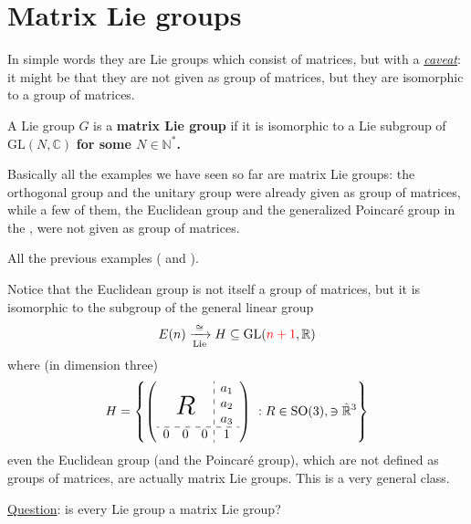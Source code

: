 \documentclass[../main.tex]{subfiles}
\begin{document}
\section{Matrix Lie groups}
In simple words they are Lie groups which consist of matrices, but with a \textit{\href{https://it.wikipedia.org/wiki/Caveat}{caveat}}: it might be that they are not given as group of matrices, but they are isomorphic to a group of matrices.
\begin{definition}A Lie group $G$ is a \textbf{matrix Lie group} if it is isomorphic to a Lie subgroup of $\textrm{GL}(N,\mathbb{C})$ \textbf{for some $N\in\mathbb{N}^\ast$.}
\end{definition}
Basically all the examples we have seen so far are matrix Lie groups: the orthogonal group and the unitary group were already given as group of matrices, while a few of them, the Euclidean group and the generalized Poincaré group in the , were not given as group of matrices.
\begin{example}
All the previous examples ( and ). 

Notice that the Euclidean group is not itself a group of matrices, but it is isomorphic to the subgroup of the general linear group
\[
E(n) \xrightarrow[\textrm{Lie}]{\cong}H \subseteq \textrm{GL}({\color{red}n+1}, \mathbb{R})
\]
where (in dimension three) 
\[
H=\Bqty{
\left(
\begin{array}{ccc:c}
& & & a_1\\
& \bigR & & a_2\\
& & & a_3\\
\hdashline
0&0&0 &1\\
\end{array}
\right) \ : R\in \textrm{SO}(3), \ni \hat{\mathbb{R}}^3
}
\]
even the Euclidean group (and the Poincaré group), which are not defined as groups of matrices, are actually matrix Lie groups. This is a very general class.
\end{example}
\underline{Question}: is every Lie group a matrix Lie group?
\end{document}
